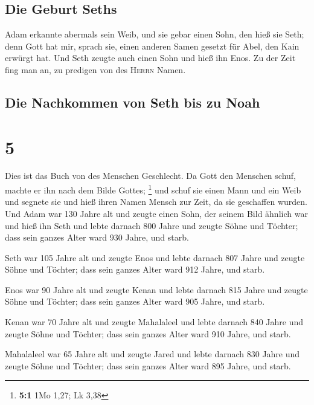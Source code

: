 \hypertarget{die-geburt-seths}{%
\subsection{Die Geburt Seths}\label{die-geburt-seths}}

 Adam erkannte abermals sein Weib, und sie gebar einen
Sohn, den hieß sie Seth; denn Gott hat mir, sprach sie, einen anderen
Samen gesetzt für Abel, den Kain erwürgt hat.  Und Seth
zeugte auch einen Sohn und hieß ihn Enos. Zu der Zeit fing man an, zu
predigen von des \textsc{Herrn} Namen.

\hypertarget{die-nachkommen-von-seth-bis-zu-noah}{%
\subsection{Die Nachkommen von Seth bis zu
Noah}\label{die-nachkommen-von-seth-bis-zu-noah}}

\hypertarget{section-4}{%
\section{5}\label{section-4}}

 Dies ist das Buch von des Menschen Geschlecht. Da Gott
den Menschen schuf, machte er ihn nach dem Bilde Gottes; \footnote{\textbf{5:1}
  1Mo 1,27; Lk 3,38}  und schuf sie einen Mann und ein
Weib und segnete sie und hieß ihren Namen Mensch zur Zeit, da sie
geschaffen wurden.  Und Adam war 130 Jahre alt und zeugte
einen Sohn, der seinem Bild ähnlich war und hieß ihn Seth 
und lebte darnach 800 Jahre und zeugte Söhne und Töchter; 
dass sein ganzes Alter ward 930 Jahre, und starb.

 Seth war 105 Jahre alt und zeugte Enos  und
lebte darnach 807 Jahre und zeugte Söhne und Töchter; 
dass sein ganzes Alter ward 912 Jahre, und starb.

 Enos war 90 Jahre alt und zeugte Kenan 
und lebte darnach 815 Jahre und zeugte Söhne und Töchter;
 dass sein ganzes Alter ward 905 Jahre, und starb.

 Kenan war 70 Jahre alt und zeugte Mahalaleel
 und lebte darnach 840 Jahre und zeugte Söhne und
Töchter;  dass sein ganzes Alter ward 910 Jahre, und
starb.

 Mahalaleel war 65 Jahre alt und zeugte Jared
 und lebte darnach 830 Jahre und zeugte Söhne und
Töchter;  dass sein ganzes Alter ward 895 Jahre, und
starb.

